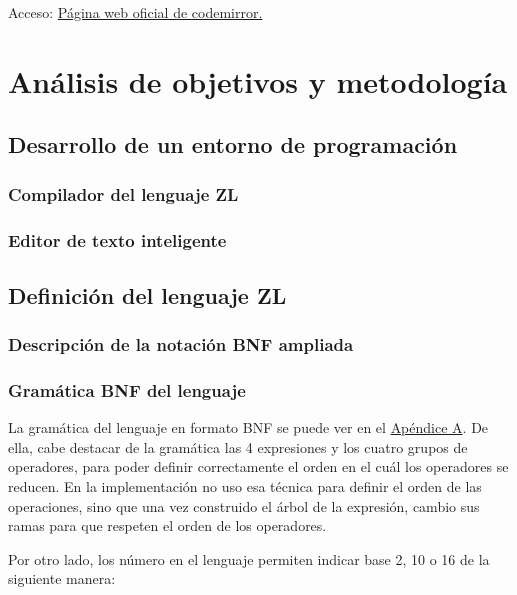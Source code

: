 \documentclass{report}
\begin{document}
	Acceso:
	\href{http://codemirror.net/}{Página web oficial de codemirror.}
	
	\chapter{Análisis de objetivos y metodología}
	
	\section{Desarrollo de un entorno de programación}
	
	\subsection{Compilador del lenguaje ZL}
	
	\subsection{Editor de texto inteligente}
	
	\section{Definición del lenguaje ZL}
	
	
	\subsection{Descripción de la notación BNF ampliada}
	
	\subsection{Gramática BNF del lenguaje}
	La gramática del lenguaje en formato BNF se puede ver en el \hyperref[app:a]{Apéndice A}. De ella, cabe destacar de la gramática las 4 expresiones y los cuatro grupos de operadores, para poder definir correctamente el orden en el cuál los operadores se reducen. En la implementación no uso esa técnica para definir el orden de las operaciones, sino que una vez construido el árbol de la expresión, cambio sus ramas para que respeten el orden de los operadores. 
		
	\hfill
	
	Por otro lado, los número en el lenguaje permiten indicar base 2, 10 o 16 de la siguiente manera:
		
\end{document}
